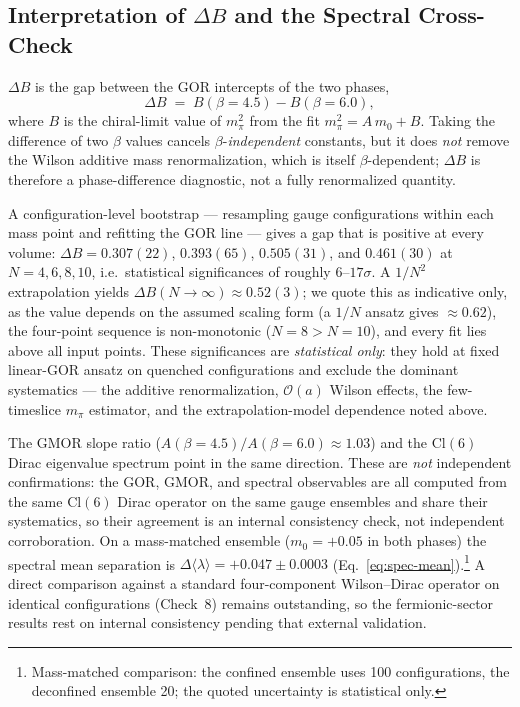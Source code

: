 \documentclass[12pt]{article}
\newcommand{\cl}{\mathrm{Cl}}          %
\begin{document}
\subsection{Interpretation of \texorpdfstring{$\Delta B$}{DeltaB}
and the Spectral Cross-Check}
\label{sec:interpretation}

$\Delta B$ is the gap between the GOR intercepts of the two phases,
\[
  \Delta B \;=\; B(\beta=4.5) - B(\beta=6.0),
\]
where $B$ is the chiral-limit value of $m_\pi^2$ from the fit
$m_\pi^2 = A\,m_0 + B$.  Taking the difference of two $\beta$ values
cancels $\beta$-\emph{independent} constants, but it does \emph{not}
remove the Wilson additive mass renormalization, which is itself
$\beta$-dependent; $\Delta B$ is therefore a phase-difference diagnostic,
not a fully renormalized quantity.

A configuration-level bootstrap --- resampling gauge configurations
within each mass point and refitting the GOR line --- gives a gap that is
positive at every volume: $\Delta B = 0.307(22)$, $0.393(65)$,
$0.505(31)$, and $0.461(30)$ at $N = 4,6,8,10$, i.e.\ statistical
significances of roughly $6$--$17\sigma$.  A $1/N^2$ extrapolation yields
$\Delta B(N\to\infty)\approx 0.52(3)$; we quote this as indicative only,
as the value depends on the assumed scaling form (a $1/N$ ansatz gives
$\approx 0.62$), the four-point sequence is non-monotonic ($N=8 > N=10$),
and every fit lies above all input points.  These significances are
\emph{statistical only}: they hold at fixed linear-GOR ansatz on quenched
configurations and exclude the dominant systematics --- the additive
renormalization, $\mathcal{O}(a)$ Wilson effects, the few-timeslice
$m_\pi$ estimator, and the extrapolation-model dependence noted above.

The GMOR slope ratio ($A(\beta=4.5)/A(\beta=6.0)\approx 1.03$) and the
$\cl(6)$ Dirac eigenvalue spectrum point in the same direction.  These
are \emph{not} independent confirmations: the GOR, GMOR, and spectral
observables are all computed from the same $\cl(6)$ Dirac operator on the
same gauge ensembles and share their systematics, so their agreement is
an internal consistency check, not independent corroboration.  On a
mass-matched ensemble ($m_0 = +0.05$ in both phases) the spectral mean
separation is $\Delta\langle\lambda\rangle = +0.047 \pm 0.0003$
(Eq.~\eqref{eq:spec-mean}).\footnote{Mass-matched comparison: the
confined ensemble uses 100 configurations, the deconfined ensemble 20;
the quoted uncertainty is statistical only.}  A direct comparison against
a standard four-component Wilson--Dirac operator on identical
configurations (Check~8) remains outstanding, so the fermionic-sector
results rest on internal consistency pending that external validation.
\end{document}
